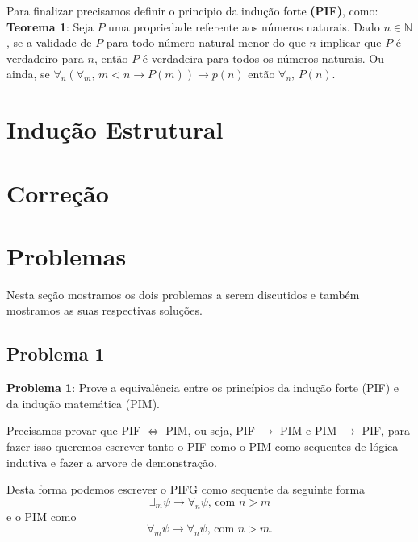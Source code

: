 \documentclass[a4paper, 10pt]{article}
\begin{document}
Para finalizar precisamos definir o principio da indução forte \textbf{(PIF)}, como:\\
\textbf{Teorema 1}: Seja $P$ uma propriedade referente aos números naturais. Dado $n \in \mathbb{N}$, se a validade de $P$ para todo número natural menor do que $n$ implicar  que $P$ é verdadeiro para $n$, então $P$ é verdadeira para todos os números naturais. Ou ainda, se $\forall_n ( \forall_m ,\, m < n \rightarrow P(m)) \rightarrow p(n)$ então $\forall_n ,\, P(n)$.


\section{Indução Estrutural}

\section{Correção}

\section{Problemas}

Nesta seção mostramos os dois problemas a serem discutidos e também mostramos as suas respectivas soluções.

\subsection{Problema 1}

\textbf{Problema 1}: Prove a equivalência entre os princípios da indução forte (PIF) e da indução matemática (PIM)\cite{Apostila}.

Precisamos provar que PIF $\Leftrightarrow$ PIM, ou seja, PIF $\rightarrow$ PIM e PIM $\rightarrow$ PIF, para fazer isso queremos escrever tanto o PIF como o PIM como sequentes de lógica indutiva e fazer a arvore de demonstração. 

Desta forma podemos escrever o PIFG como sequente da seguinte forma
\begin{equation}
\exists_m \psi \to \forall_n \psi \textrm{, com } n > m
\label{eq:pifg}
\end{equation}
e o PIM como
\begin{equation}
\forall_m \psi \to \forall_n \psi \textrm{, com } n > m.
\label{eq:pim}
\end{equation}
\end{document}
